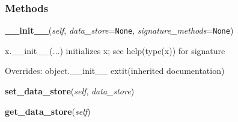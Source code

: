   \subsubsection{Methods}

    \vspace{0.5ex}

\hspace{.8\funcindent}\begin{boxedminipage}{\funcwidth}

    \raggedright \textbf{\_\_init\_\_}(\textit{self}, \textit{data\_store}={\tt None}, \textit{signature\_methods}={\tt None})

\setlength{\parskip}{2ex}
    x.\_\_init\_\_(...) initializes x; see help(type(x)) for signature

\setlength{\parskip}{1ex}
      Overrides: object.\_\_init\_\_ 	extit{(inherited documentation)}

    \end{boxedminipage}

    \label{lib:oauth:OAuthServer:set_data_store}

    \vspace{0.5ex}

\hspace{.8\funcindent}\begin{boxedminipage}{\funcwidth}

    \raggedright \textbf{set\_data\_store}(\textit{self}, \textit{data\_store})

\setlength{\parskip}{2ex}
\setlength{\parskip}{1ex}
    \end{boxedminipage}

    \label{lib:oauth:OAuthServer:get_data_store}

    \vspace{0.5ex}

\hspace{.8\funcindent}\begin{boxedminipage}{\funcwidth}

    \raggedright \textbf{get\_data\_store}(\textit{self})

\setlength{\parskip}{2ex}
\setlength{\parskip}{1ex}
    \end{boxedminipage}


